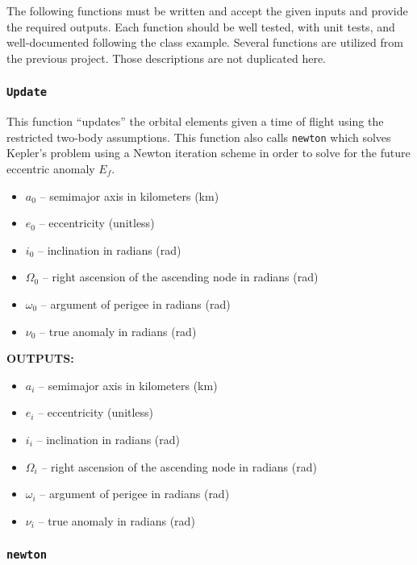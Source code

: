 \documentclass[11pt, reqno]{article}    %
\begin{document}
The following functions must be written and accept the given inputs and provide the required outputs. 
Each function should be well tested, with unit tests, and well-documented following the class example.
Several functions are utilized from the previous project. 
Those descriptions are not duplicated here.

\subsubsection*{\texttt{Update}}
This function ``updates'' the orbital elements given a time of flight using the restricted two-body assumptions.
This function also calls \texttt{newton} which solves Kepler's problem using a Newton iteration scheme in order to solve for the future eccentric anomaly \( E_f \).

\begin{itemize}
    \item \( a_0 \)  -- semimajor axis in kilometers (\si{\kilo\meter})
    \item \( e_0 \) -- eccentricity (unitless)
    \item \( i_0 \) -- inclination in radians (\si{\radian})
    \item \( \Omega_0 \) -- right ascension of the ascending node in radians (\si{\radian})
    \item \( \omega_0 \) -- argument of perigee in radians (\si{\radian})
    \item \( \nu_0 \) -- true anomaly in radians (\si{\radian})
\end{itemize}

\noindent \textbf{OUTPUTS:}
\begin{itemize}
    \item \( a_i \)  -- semimajor axis in kilometers (\si{\kilo\meter})
    \item \( e_i \) -- eccentricity (unitless)
    \item \( i_i \) -- inclination in radians (\si{\radian})
    \item \( \Omega_i \) -- right ascension of the ascending node in radians (\si{\radian})
    \item \( \omega_i \) -- argument of perigee in radians (\si{\radian})
    \item \( \nu_i \) -- true anomaly in radians (\si{\radian})
\end{itemize}

\subsubsection*{\texttt{newton}}
\end{document}
